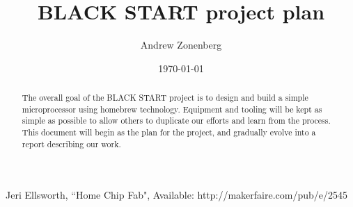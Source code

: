 \documentclass{article}
\begin{document}
\onecolumn
\title{BLACK START project plan}
\author{Andrew Zonenberg}
\date{\today}
\maketitle

\begin{abstract}
The overall goal of the BLACK START project is to design and build a simple microprocessor using homebrew technology. Equipment
and tooling will be kept as simple as possible to allow others to duplicate our efforts and learn from the process. This
document will begin as the plan for the project, and gradually evolve into a report describing our work.
\end{abstract}
\clearpage

\setcounter{tocdepth}{3}
\tableofcontents
\clearpage

 \cleardoublepage
 \cleardoublepage
 \cleardoublepage


\pagebreak
\begin{thebibliography}{99}
	Jeri Ellsworth, ``Home Chip Fab", Available: http://makerfaire.com/pub/e/2545
\end{thebibliography}
\end{document}
